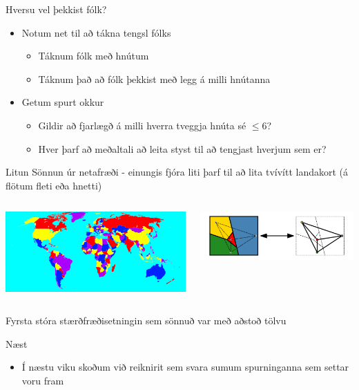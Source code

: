 \documentclass{beamer}
\begin{document}
\begin{frame}{Hversu vel þekkist fólk?}
\begin{itemize}
 \item Notum net til að tákna tengsl fólks
 \begin{itemize}
  \item Táknum fólk með hnútum
  \item Táknum það að fólk þekkist með legg á milli hnútanna
 \end{itemize}
 \item Getum spurt okkur
 \begin{itemize}
  \item Gildir að fjarlægð á milli hverra tveggja hnúta sé $\leq 6$?
  \item Hver þarf að meðaltali að leita styst til að tengjast hverjum sem er?
 \end{itemize}
\end{itemize}
\end{frame}


\begin{frame}{Litun}
Sönnun úr netafræði - einungis fjóra liti þarf til að lita tvívítt landakort (á flötum fleti eða hnetti)
\begin{columns}
\begin{center}
\includegraphics[width=\linewidth]{Pics/world-map-four-colors}
\end{center}
\begin{center}
\includegraphics[width=\linewidth]{Pics/four-color}
\end{center}
\end{columns}
\vspace{0.5cm}
Fyrsta stóra stærðfræðisetningin sem sönnuð var með aðstoð tölvu
\end{frame}

\begin{frame}{Næst}
\begin{itemize}
 \item Í næstu viku skoðum við reiknirit sem svara sumum spurninganna sem settar voru fram
\end{itemize}

\end{frame}
\end{document}
